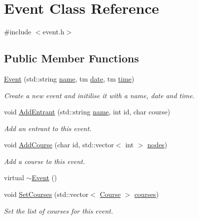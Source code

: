 \hypertarget{classEvent}{\section{\-Event \-Class \-Reference}
\label{classEvent}
}


{\ttfamily \#include $<$event.\-h$>$}

\subsection*{\-Public \-Member \-Functions}
\begin{DoxyCompactItemize}
\item 
\hyperlink{classEvent_a8f1894bd5c65c832e95b42bd4565e631}{\-Event} (std\-::string \hyperlink{classEvent_ae116bf76fb01a92e000579a5a0d6f35c}{name}, tm \hyperlink{classEvent_a5df9ecce46e9db33b3b29b99156aa70a}{date}, tm \hyperlink{classEvent_a91d5938dce4b4328e35f5626c22ec844}{time})
\begin{DoxyCompactList}\small\item\em \-Create a new event and initilise it with a name, date and time. \end{DoxyCompactList}\item 
void \hyperlink{classEvent_af38a15ffed314b5251a124f45ea41575}{\-Add\-Entrant} (std\-::string \hyperlink{classEvent_ae116bf76fb01a92e000579a5a0d6f35c}{name}, int id, char course)
\begin{DoxyCompactList}\small\item\em \-Add an entrant to this event. \end{DoxyCompactList}\item 
void \hyperlink{classEvent_a1a1fba26c0066499be299b3d3ff938b5}{\-Add\-Course} (char id, std\-::vector$<$ int $>$ \hyperlink{classEvent_a2b330c8081c3c907a02daa7da8043fc6}{nodes})
\begin{DoxyCompactList}\small\item\em \-Add a course to this event. \end{DoxyCompactList}\item 
virtual \hyperlink{classEvent_a7704ec01ce91e673885792054214b3d2}{$\sim$\-Event} ()
\item 
void \hyperlink{classEvent_a894b95d4d8b4844798ec95fa5ef8141a}{\-Set\-Courses} (std\-::vector$<$ \hyperlink{classCourse}{\-Course} $>$ \hyperlink{classEvent_a54f5b521beee9f8714ac33e304c948b0}{courses})
\begin{DoxyCompactList}\small\item\em \-Set the list of courses for this event. \end{DoxyCompactList}\item 

\end{DoxyCompactItemize}
